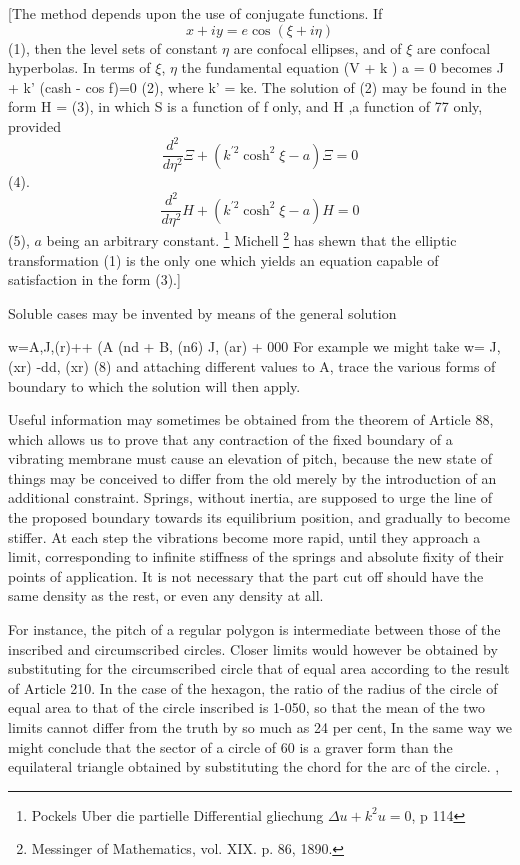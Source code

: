 [The method depends upon the use of conjugate functions. If
\[ x  +  i y =  e \cos ( \xi  + i \eta ) \]
(1), then the level sets of constant \(\eta \) are confocal ellipses,
and of \(\xi\) are confocal hyperbolas.  In terms of \(\xi\), \(\eta\)
the fundamental equation
(V + k ) a = 0 becomes
J + k' (cash - cos f)=0 (2),
where k' = ke.
The solution of (2) may be found in the form
H = (3),
in which S is a function of f only, and H ,a function of 77 only, provided
\[ \frac{d^2}{d \eta^2} \Xi  + (k^{\prime 2} \cosh^2 \xi -a ) \Xi = 0 \]
(4).
\[ \frac{d^2}{d \eta^2} H  + (k^{\prime 2} \cosh^2 \xi -a ) H = 0 \]
(5), \(a\) being an arbitrary constant.
\footnote{Pockels Uber die partielle Differential gliechung \(\Delta u+k^2u=0\), p 114}
Michell
\footnote{Messinger of Mathematics, vol. XIX. p. 86, 1890.}
has shewn that the elliptic transformation (1) is the
only one which yields an equation capable of satisfaction in the form (3).]

Soluble cases may be invented by means of the general solution

w=A,J,(r)++ (A (nd + B, (n6) J, (ar) + 000 For example we might take
w= J, (xr) -dd, (xr) (8)
and attaching different values to A, trace the various forms of boundary
to which the solution will then apply.

Useful information may sometimes be obtained from the theorem of Article 88,
which allows us to prove that any contraction of the fixed boundary
of a vibrating membrane must cause an elevation of pitch, because the
new state of things may be conceived to differ from the old merely by
the introduction of an additional constraint. Springs, without inertia,
are supposed to urge the line of the proposed boundary towards its
equilibrium position, and gradually to become stiffer. At each step the
vibrations become more rapid, until they approach a limit, corresponding
to infinite stiffness of the springs and absolute fixity of their points
of application. It is not necessary that the part cut off should have
the same density as the rest, or even any density at all.


For instance, the pitch of a regular polygon is intermediate between
those of the inscribed and circumscribed circles. Closer limits would
however be obtained by substituting for the circumscribed circle that of
equal area according to the result of Article 210. In the case of the
hexagon, the ratio of the radius of the circle of equal area to that of
the circle inscribed is 1-050, so that the mean
of the two limits cannot differ from the truth by so much as 24 per
cent, In the same way we might conclude that the sector of a circle of
60 is a graver form than the equilateral triangle obtained by
substituting the chord for the arc of the circle. ,


